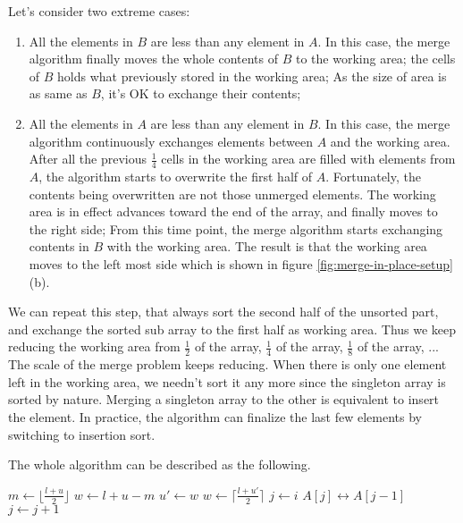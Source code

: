 \documentclass[UTF8]{article}
\begin{document}
Let's consider two extreme cases:

\begin{enumerate}
\item All the elements in $B$ are less than any element in $A$. In this case, the merge algorithm
finally moves the whole contents of $B$ to the working area; the cells of $B$ holds what previously
stored in the working area; As the size of area is as same as $B$, it's OK to exchange their contents;
\item All the elements in $A$ are less than any element in $B$. In this case, the merge algorithm
continuously exchanges elements between $A$ and the working area. After all the previous $\frac{1}{4}$
cells in the working area are filled with elements from $A$, the algorithm starts to overwrite the
first half of $A$. Fortunately, the contents being overwritten are not those unmerged elements.
The working area is in effect advances toward the end of the array, and finally moves to the right
side; From this time point, the merge algorithm starts exchanging contents in $B$ with the working area.
The result is that the working area moves to the left most side which is shown in figure \ref{fig:merge-in-place-setup} (b).
\end{enumerate}

We can repeat this step, that always sort the second half of the unsorted part, and exchange
the sorted sub array to the first half as working area. Thus we keep reducing the working area
from $\frac{1}{2}$ of the array, $\frac{1}{4}$
of the array, $\frac{1}{8}$ of the array, ... The scale of the merge problem keeps reducing.
When there is only one element left in the working area, we needn't sort it any more since
the singleton array is sorted by nature. Merging a singleton array to the other is equivalent
to insert the element. In practice, the algorithm can finalize the last few
elements by switching to insertion sort.

The whole algorithm can be described as the following.

\begin{algorithmic}[1]
    \State $m \gets \lfloor \frac{l + u}{2} \rfloor$
    \State $w \gets l + u - m$
    \State {} 
      \State $u' \gets w$
      \State $w \gets \lceil \frac{l + u'}{2} \rceil$ 
      \State {} 
      \State {}
    \EndWhile
     
      \State $j \gets i$
        \State {} $A[j] \leftrightarrow A[j-1]$
        \State $j \gets j + 1$
      \EndWhile
    \EndFor
  \EndIf
\EndProcedure
\end{algorithmic}
\end{document}
